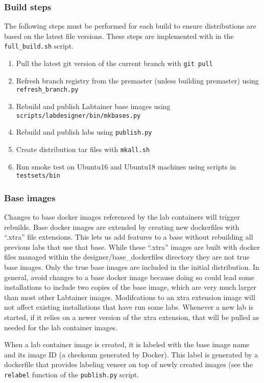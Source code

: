 \documentclass[12pt]{article}
\begin{document}
\subsubsection{Build steps}
The following steps must be performed for each build to ensure distributions are based on the latest file versions.
These steps are implemented with in the {\tt full\_build.sh} script.
\begin{enumerate}
\item Pull the latest git version of the current branch with {\tt git pull}
\item Refresh branch registry from the premaster (unless building premaster) using {\tt refresh\_branch.py}
\item Rebuild and publish Labtainer base images using {\tt scripts/labdesigner/bin/mkbases.py}
\item Rebuild and publish labs using {\tt publish.py}
\item Create distribution tar files with {\tt mkall.sh}
\item Run smoke test on Ubuntu16 and Ubuntu18 machines using scripts in {\tt testsets/bin}
\end{enumerate}

\subsubsection{Base images}
Changes to base docker images referenced by the lab containers will trigger rebuilds.  Base docker images are extended by creating
new dockerfiles with ``.xtra'' file extensions.  
This lets us add features to a base without rebuilding all previous labs that use that base.  
While these ``.xtra'' images are built with docker files managed within the
designer/base\_dockerfiles directory they are not true base images.
Only the true base images are included in the initial distribution.  
In general, avoid changes to a base docker image because doing so could lead some installations
to include two copies of the base image, which are very much larger than most other Labtainer images.  
Modifcations to an xtra extension image will not affect existing installations that have run
some labs.  Whenever a new lab is started, if it relies on a newer version of the xtra extension, that will be pulled as needed for the 
lab container images.

When a lab container image is created, it is labeled with the base image name and its image ID (a checksum generated by Docker).
This label is generated by a dockerfile that provides labeling veneer on top of newly created images (see the {\tt relabel} function
of the {\tt publish.py} script.
\end{document}

